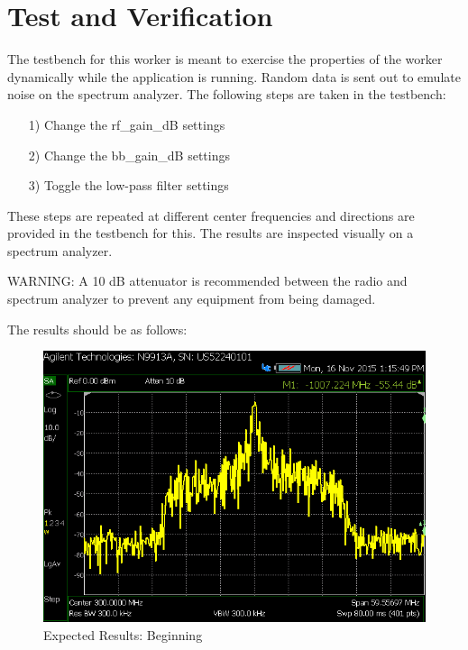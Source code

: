 \documentclass{article}
\begin{document}
\section*{Test and Verification}
\begin{flushleft}
	The testbench for this worker is meant to exercise the properties of the worker dynamically while the application is running.  Random data is sent out to emulate noise on the spectrum analyzer.  The following steps are taken in the testbench:
	\begin{itemize}
		\item[1)] Change the rf\_gain\_dB settings
		\item[2)] Change the bb\_gain\_dB settings
		\item[3)] Toggle the low-pass filter settings
	\end{itemize}
	These steps are repeated at different center frequencies and directions are provided in the testbench for this.  The results are inspected visually on a spectrum analyzer.\par\medskip
	WARNING: A 10 dB attenuator is recommended between the radio and spectrum analyzer to prevent any equipment from being damaged.\par\medskip
	  The results should be as follows:
	\vspace{10 mm}
	\begin{figure}[ht]
		\centerline{\includegraphics[scale=0.7]{NoFilter}}
		\caption{Expected Results: Beginning}
		\label{fig:tb1}
	\end{figure}
	\vspace{10 mm}
	\newpage
	\begin{figure}[ht]

\end{figure}
\end{flushleft}
\end{document}
